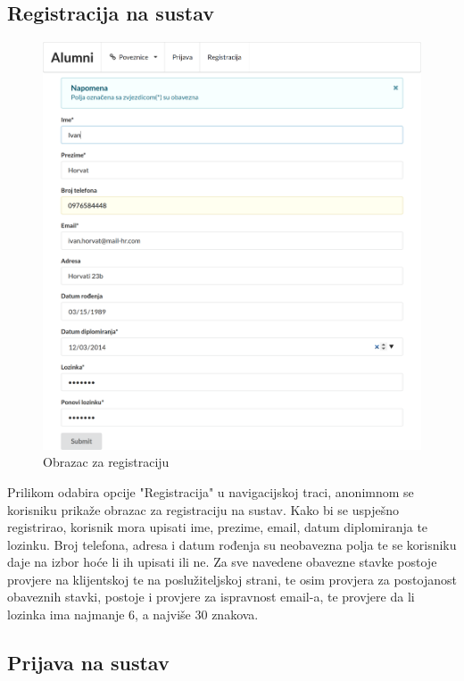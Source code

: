 \documentclass[zavrsni, numeric]{fer}
\begin{document}
\subsection{Registracija na sustav}

\begin{figure}[H]
	\centering
	\includegraphics[width=13cm]{slike/registracija.png}
	\caption{Obrazac za registraciju}
	\label{fig:registracija}
\end{figure}

Prilikom odabira opcije "Registracija" u navigacijskoj traci, anonimnom se korisniku prikaže obrazac za registraciju na sustav. Kako bi se uspješno registrirao, korisnik mora upisati ime, prezime, email, datum diplomiranja te lozinku. Broj telefona, adresa i datum rođenja su neobavezna polja te se korisniku daje na izbor hoće li ih upisati ili ne. Za sve navedene obavezne stavke postoje provjere na klijentskoj te na poslužiteljskoj strani, te osim provjera za postojanost obaveznih stavki, postoje i provjere za ispravnost email-a, te provjere da li lozinka ima najmanje 6, a najviše 30 znakova.

\subsection{Prijava na sustav}
\end{document}

